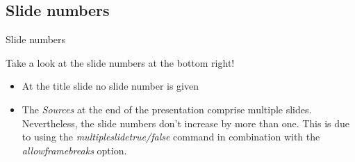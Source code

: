 \subsection{Slide numbers}   
  
\begin{frame}{Slide numbers}

  Take a look at the slide numbers at the bottom right! 

  \begin{itemize}
    \item At the title slide no slide number is given
    \item The \textit{Sources} at the end of the presentation
          comprise multiple slides. Nevertheless, the slide 
          numbers don't increase by more than one. This is due
          to using the \textit{multipleslidetrue/false} command
          in combination with the \textit{allowframebreaks}
          option.
  \end{itemize}

\end{frame}